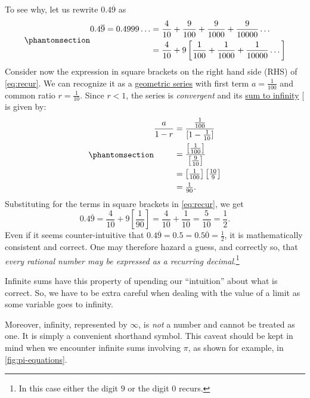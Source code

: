 \documentclass[
  a4paper,
]{article}
\begin{document}
To see why, let us rewrite \(0.4\overline{9}\) as
\begin{equation}\phantomsection\label{eq:recur}{
\begin{aligned}
0.4\overline{9} = 0.4999\dots &= \frac{4}{10} + \frac{9}{100} + \frac{9}{1000} + \frac{9}{10000}\dots\\
&= \frac{4}{10} + 9\left[ \frac{1}{100} + \frac{1}{1000} + \frac{1}{10000} \dots\right]\\
\end{aligned}
}\end{equation} Consider now the expression in square brackets on the
right hand side (RHS) of \cref{eq:recur}. We can recognize it as a
\href{https://mathworld.wolfram.com/GeometricSeries.html}{geometric
series} with first term \(a = \frac{1}{100}\) and common ratio
\(r = \frac{1}{10}\). Since \(r < 1\), the series is \emph{convergent}
and its
\href{https://senecalearning.com/en-GB/revision-notes/a-level/maths/edexcel/pure-maths/4-2-9-sum-to-infinity-of-a-geometric-series}{sum
to infinity} {[}\citeproc{ref-seneca}{1}{]} is given by:
\begin{equation}\phantomsection\label{eq:sum}{
\begin{aligned}
\frac{a}{1 - r} &= \frac{\frac{1}{100}}{[1 - \frac{1}{10}]}\\
&= \frac{\left[\frac{1}{100}\right]}{\left[\frac{9}{10}\right]}\\
&= \left[\tfrac{1}{100}\right] \left[\tfrac{10}{9}\right]\\
& = \tfrac{1}{90}.
\end{aligned}
}\end{equation} Substituting for the terms in square brackets in
\cref{eq:recur}, we get \[
0.4\overline{9} = \frac{4}{10} + 9\left[\frac{1}{90}\right] = \frac{4}{10} + \frac{1}{10} = \frac{5}{10} = \frac{1}{2}.
\] Even if it seems counter-intuitive that
\(0.4\overline{9} = 0.5 = 0.5\overline{0} = \frac{1}{2}\), it is
mathematically consistent and correct. One may therefore hazard a guess,
and correctly so, that \emph{every rational number may be expressed as a
recurring decimal}.\footnote{In this case either the digit \(9\) or the
  digit \(0\) recurs.}

Infinite sums have this property of upending our ``intuition'' about
what is correct. So, we have to be extra careful when dealing with the
value of a limit as some variable goes to infinity.

Moreover, infinity, represented by \(\infty\), is \emph{not} a number
and cannot be treated as one. It is simply a convenient shorthand
symbol. This caveat should be kept in mind when we encounter infinite
sums involving \(\pi\), as shown for example, in
\cref{fig:pi-equations}.
\end{document}
